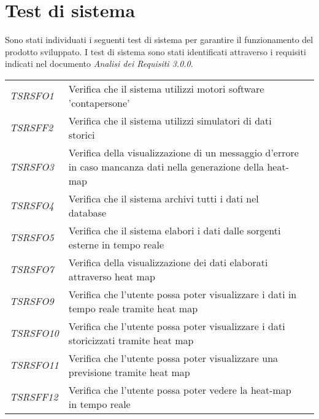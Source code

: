 \section{Test di sistema}\label{TestDiSistema}
Sono stati individuati i seguenti test di sistema per garantire il funzionamento del prodotto sviluppato. I test di sistema sono stati identificati attraverso i requisiti indicati nel documento \textit{Analisi dei Requisiti 3.0.0}. 
\def\tabularxcolumn#1{m{#1}}
{
	
	\begin{center}
		\renewcommand{\arraystretch}{1.4}
		\begin{longtable}{|p{3cm}|p{8cm}|p{3cm}|}
			\hline
			\rowcolor{airforceblue}
			\makecell[c]{\textbf{Id Test}} & \makecell[c]{\textbf{Descrizione}} & \makecell[c]{\textbf{Esito}} \\
			\hline
			\textit{TSRSFO1} & Verifica che il sistema utilizzi motori software 'contapersone' & \makecell[tc]{\textit{NI}} \\
			\hline
			\textit{TSRSFF2} & Verifica che il sistema utilizzi simulatori di dati storici & \makecell[tc]{\textit{NI}}\\
			\hline
			\textit{TSRSFO3} & Verifica della visualizzazione di un messaggio d'errore in caso mancanza dati nella generazione della heat-map &\makecell[tc]{\textit{NI}}\\
			\hline
			\textit{TSRSFO4} & Verifica che il sistema archivi tutti i dati nel database & \makecell[tc]{\textit{NI}}\\
			\hline
			\textit{TSRSFO5} & Verifica che il sistema elabori i dati dalle sorgenti esterne in tempo reale & \makecell[tc]{\textit{NI}}\\
			\hline
			\textit{TSRSFO7} & Verifica della visualizzazione dei dati elaborati attraverso heat map & \makecell[tc]{\textit{NI}}\\
			\hline
			\textit{TSRSFO9} & Verifica che l’utente possa poter visualizzare i dati in tempo reale tramite heat map & \makecell[tc]{\textit{NI}}\\
			\hline
			\textit{TSRSFO10} & Verifica che l’utente possa poter visualizzare i dati storicizzati tramite heat map & \makecell[tc]{\textit{NI}}\\
			\hline
			\textit{TSRSFO11} & Verifica che l’utente possa poter visualizzare una previsione tramite heat map & \makecell[tc]{\textit{NI}}\\
			\hline
			\textit{TSRSFF12} & Verifica che l'utente possa poter vedere la heat-map in tempo reale & \makecell[tc]{\textit{NI}}\\

\end{longtable}
\end{center}}
